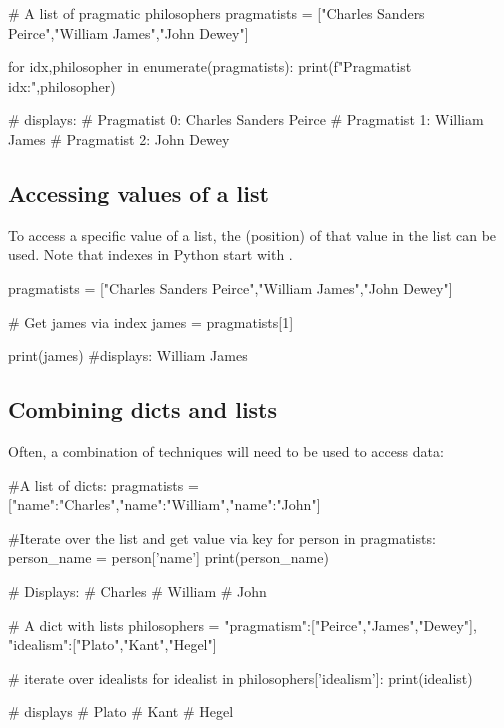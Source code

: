 \begin{pycode}
    # A list of pragmatic philosophers
    pragmatists = ["Charles Sanders Peirce","William James","John Dewey"]

    for idx,philosopher in enumerate(pragmatists):
    print(f"Pragmatist {idx}:",philosopher)

    # displays:
    # Pragmatist 0: Charles Sanders Peirce
    # Pragmatist 1: William James
    # Pragmatist 2: John Dewey
\end{pycode}

\subsection{Accessing values of a list}

To access a specific value of a list, the  (position) of that value in the list can be used. Note that indexes in Python start with .

\begin{pycode}
    pragmatists = ["Charles Sanders Peirce","William James","John Dewey"]

    # Get james via index
    james = pragmatists[1]

    print(james) #displays: William James
\end{pycode}

\subsection{Combining dicts and lists}

Often, a combination of techniques will need to be used to access data:

\begin{pycode}
    #A list of dicts:
    pragmatists = [{"name":"Charles"},{"name":"William"},{"name":"John"}]

    #Iterate over the list and get value via key
    for person in pragmatists:
    person_name = person['name']
    print(person_name)

    # Displays:
    # Charles
    # William
    # John
\end{pycode}

\begin{pycode}
    # A dict with lists
    philosophers = {
    "pragmatism":["Peirce","James","Dewey"],
    "idealism":["Plato","Kant","Hegel"]
    }

    # iterate over idealists
    for idealist in philosophers['idealism']:
    print(idealist)

    # displays
    # Plato
    # Kant
    # Hegel

\end{pycode}


